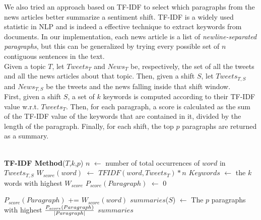 We also tried an approach based on TF-IDF to select which paragraphs from the news articles better summarize a sentiment shift. TF-IDF is a widely used statistic in NLP and is indeed a effective technique to extract keywords from documents. In our implementation, each news article is a list of \emph{newline-separated paragraphs}, but this can be generalized by trying every possible set of $n$ contiguous sentences in the text.
\\
Given a topic $T$, let $Tweets_T$ and $News_T$ be, respectively, the set of all the tweets and all the news articles about that topic. Then, given a shift $S$, let $Tweets_{T,S}$ and $News_{T,S}$ be the tweets and the news falling inside that shift window.
\\
First, given a shift $S$, a set of $k$ keywords is computed according to their TF-IDF value w.r.t. $Tweets_T$. Then, for each paragraph, a score is calculated as the sum of the TF-IDF value of the keywords that are contained in it, divided by the length of the paragraph. Finally, for each shift, the top $p$ paragraphs are returned as a summary.
\\\\
\begin{algorithmic}
\STATE \textbf{TF-IDF Method}($T$,$k$,$p$)
\STATE
{}
		\STATE $n$ $\leftarrow$ number of total occurrences of $word$ in $Tweets_{T,S}$
		\STATE $W_{score}(word)$ $\leftarrow$ $TFIDF(word,Tweets_T) * n$
	\ENDFOR
	\STATE
	\STATE $Keywords$ $\leftarrow$ the $k$ words with highest $W_{score}$
	\STATE
			\STATE $P_{score}(Paragraph)$ $\leftarrow$ $0$

					\STATE $P_{score}(Paragraph)$ += $W_{score}(word)$
				\ENDIF
			\ENDFOR
		\ENDFOR
	\ENDFOR
	\STATE
	\STATE $summaries$($S$) $\leftarrow$ The $p$ paragraphs with highest $ {P_{score}(Paragraph) \over |Paragraph| } $
\ENDFOR
\STATE
\RETURN $summaries$


\end{algorithmic}



